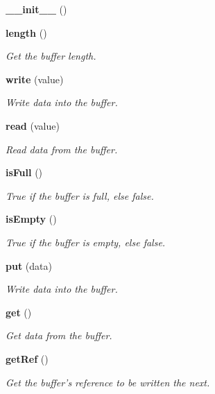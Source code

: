 \begin{CompactItemize}
\item 
{\bf \_\-\_\-init\_\-\_\-} ()
\item 
{\bf length} ()
\begin{CompactList}\small\item\em Get the buffer length. \item\end{CompactList}\item 
{\bf write} (value)
\begin{CompactList}\small\item\em Write data into the buffer. \item\end{CompactList}\item 
{\bf read} (value)
\begin{CompactList}\small\item\em Read data from the buffer. \item\end{CompactList}\item 
{\bf is\-Full} ()
\begin{CompactList}\small\item\em True if the buffer is full, else false. \item\end{CompactList}\item 
{\bf is\-Empty} ()
\begin{CompactList}\small\item\em True if the buffer is empty, else false. \item\end{CompactList}\item 
{\bf put} (data)
\begin{CompactList}\small\item\em Write data into the buffer. \item\end{CompactList}\item 
{\bf get} ()
\begin{CompactList}\small\item\em Get data from the buffer. \item\end{CompactList}\item 
{\bf get\-Ref} ()
\begin{CompactList}\small\item\em Get the buffer's reference to be written the next. \item\end{CompactList}\end{CompactItemize}



